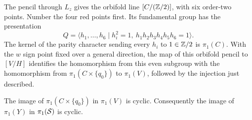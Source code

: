 The pencil through $L_z$ gives the orbifold line
$[C/(\mathbb Z/2)]$, with six order-two points.  Number the four red points
first.  Its fundamental group has the presentation
\begin{equation}\label{app:pencil-group}
 Q=\langle h_1,\ldots,h_6\mid
       h_i^2=1,\ h_1h_2h_3h_4h_5h_6=1\rangle.
\end{equation}
The kernel of the parity character sending every $h_i$ to $1\in\mathbb Z/2$
is $\pi_1(C)$.  With the $w$ sign point fixed over a general direction,
the map of this orbifold pencil to $[V/H]$ identifies the homomorphism
from this even subgroup with the homomorphism from
$\pi_1(C\times\{q_0\})$ to $\pi_1(V)$, followed by the injection just
described.

\begin{lemma}\label{app:cyclic-upper}
The image of $\pi_1(C\times\{q_0\})$ in $\pi_1(V)$ is cyclic.
Consequently the image of $\pi_1(Y)$ in $\pi_1(\mathcal S)$ is cyclic.
\end{lemma}

